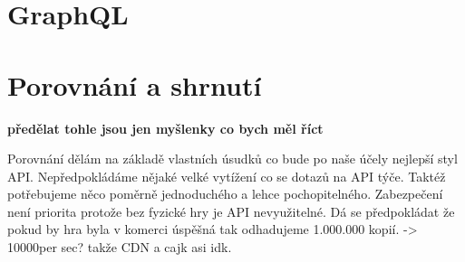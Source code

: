 \section{GraphQL}


\section{Porovnání a shrnutí} %
\textbf{předělat tohle jsou jen myšlenky co bych měl říct}

Porovnání dělám na základě vlastních úsudků co bude po naše účely nejlepší styl API. Nepředpokládáme nějaké velké vytížení co se dotazů na API týče. Taktéž potřebujeme něco poměrně jednoduchého a lehce pochopitelného. Zabezpečení není priorita protože bez fyzické hry je API nevyužitelné. Dá se předpokládat že pokud by hra byla v komerci úspěšná tak odhadujeme 1.000.000 kopií. -> 10000per sec? takže CDN a cajk asi idk.


\endinput